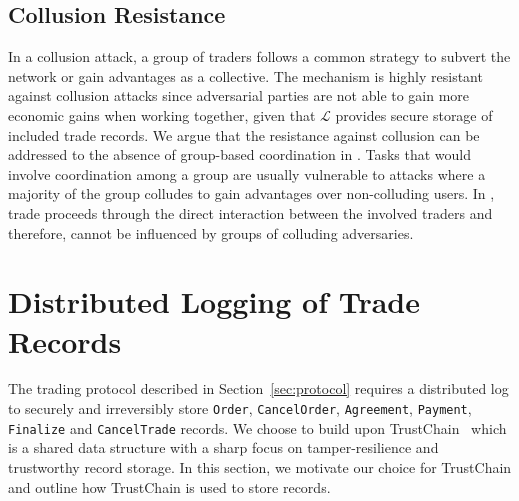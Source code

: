 \subsection{Collusion Resistance}
In a collusion attack, a group of traders follows a common strategy to subvert the network or gain advantages as a collective.
The \ModelName{} mechanism is highly resistant against collusion attacks since adversarial parties are not able to gain more economic gains when working together, given that $ \mathcal{L} $ provides secure storage of included trade records.
We argue that the resistance against collusion can be addressed to the absence of group-based coordination in \ModelName{}.
Tasks that would involve coordination among a group are usually vulnerable to attacks where a majority of the group colludes to gain advantages over non-colluding users.
In \ModelName{}, trade proceeds through the direct interaction between the involved traders and therefore, cannot be influenced by groups of colluding adversaries.

\section{Distributed Logging of Trade Records}
\label{sec:blockchain_accounting}
The \ModelName{} trading protocol described in Section~\ref{sec:protocol} requires a distributed log to securely and irreversibly store \texttt{Order}, \texttt{CancelOrder}, \texttt{Agreement}, \texttt{Payment}, \texttt{Finalize} and \texttt{CancelTrade} records.
We choose to build \ModelName{} upon TrustChain~\cite{otte2017trustchain} which is a shared data structure with a sharp focus on tamper-resilience and trustworthy record storage.
In this section, we motivate our choice for TrustChain and outline how TrustChain is used to store \ModelName{} records.

